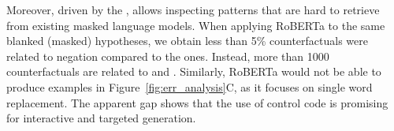 Moreover, driven by the \tagstrs, \sysname allows inspecting patterns that are hard to retrieve from existing masked language models.
When applying RoBERTa to the same blanked (masked) hypotheses, we obtain less than 5\% counterfactuals were related to negation compared to the \sysname ones.
Instead, more than 1000 counterfactuals are related to \texttt{} and \texttt{}.
Similarly, RoBERTa would not be able to produce examples in Figure~\ref{fig:err_analysis}C, as it focuses on single word replacement.
The apparent gap shows that the use of control code is promising for interactive and targeted generation.

